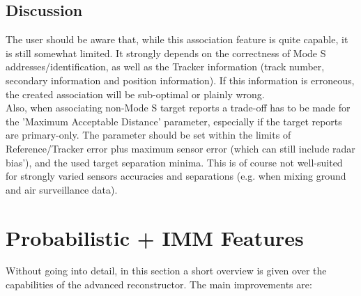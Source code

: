 \begin{itemize}
\subsection{Discussion}

The user should be aware that, while this association feature is quite capable, it is still somewhat limited. 
It strongly depends on the correctness of Mode S addresses/identification, as well as the Tracker information (track number, secondary information and position information). 
If this information is erroneous, the created association will be sub-optimal or plainly wrong. \\

Also, when associating non-Mode S target reports a trade-off has to be made for the 'Maximum Acceptable Distance' parameter, 
especially if the target reports are primary-only. The parameter should be set within the limits of Reference/Tracker error plus maximum sensor error (which can still include radar bias'), and the used target separation minima. 
This is of course not well-suited for strongly varied sensors accuracies and separations (e.g. when mixing ground and air surveillance data). \\

\section{Probabilistic + IMM Features}

Without going into detail, in this section a short overview is given over the capabilities of the advanced reconstructor. The main improvements are:


\end{itemize}
